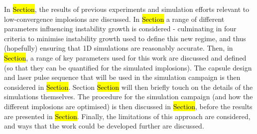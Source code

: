 In \hl{Section}, the results of previous experiments and simulation efforts relevant to low-convergence implosions are discussed. In \hl{Section} a range of different parameters influencing instability growth is considered - culminating in four criteria to minimise instability growth used to define this new regime, and thus (hopefully) ensuring that 1D simulations are reasonably accurate. Then, in \hl{Section}, a range of key parameters used for this work are discussed and defined (so that they can be quantified for the simulated implosions). The capsule design and laser pulse sequence that will be used in the simulation campaign is then considered in \hl{Section}. Section \hl{Section} will then briefly touch on the details of the simulations themselves. The procedure for the simulation campaign (and how the different implosions are optimised) is then discussed in \hl{Section}, before the results are presented in \hl{Section}. Finally, the limitations of this approach are considered, and ways that the work could be developed further are discussed.





